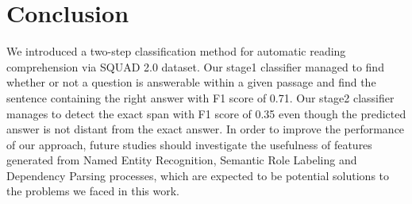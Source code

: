 \section{Conclusion}

We introduced a two-step classification method for automatic reading comprehension via SQUAD 2.0 dataset. Our stage1 classifier managed to find whether or not a question is answerable within a given passage and find the sentence containing the right answer with F1 score of 0.71. Our stage2 classifier manages to detect the exact span with F1 score of 0.35 even though the predicted answer is not distant from the exact answer. In order to improve the performance of our approach, future studies should investigate the usefulness of features generated from Named Entity Recognition, Semantic Role Labeling and Dependency Parsing processes, which are expected to be potential solutions to the problems we faced in this work. 